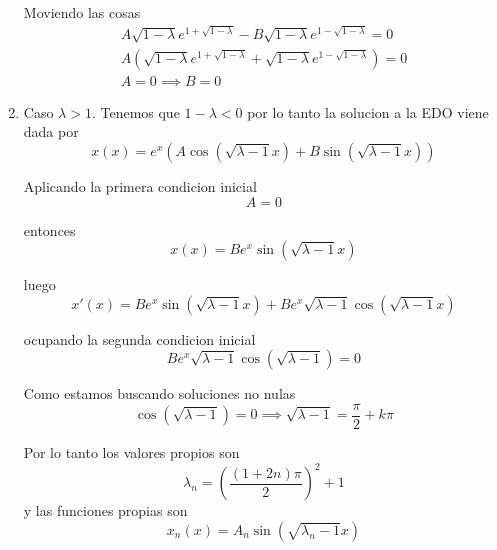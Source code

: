 \message{ !name(MAT024.tex)}\documentclass[../main.tex]{subfiles}
\begin{document}
\begin{solution}
\begin{enumerate}
            Moviendo las cosas
            \begin{gather*}
              A\sqrt{1 - \lambda}e^{1 + \sqrt{1 - \lambda}}  - B\sqrt{1 - \lambda}e^{1 - \sqrt{1 - \lambda}} = 0\\
              A(\sqrt{1 - \lambda}e^{1 + \sqrt{1 - \lambda}} + \sqrt{1 - \lambda}e^{1 - \sqrt{1 - \lambda}}) = 0\\
              A = 0 \implies B = 0
            \end{gather*}
      \item Caso $\lambda > 1$. Tenemos que $1 - \lambda < 0$ por lo tanto la solucion a la EDO viene dada por
            \begin{equation*}
              x(x) = e^{x}(A \cos(\sqrt{\lambda - 1} x) + B \sin(\sqrt{\lambda - 1}x))
            \end{equation*}

            Aplicando la primera condicion inicial
            \begin{equation*}
              A = 0
            \end{equation*}

            entonces
            \begin{equation*}
              x(x) = B e^{x} \sin(\sqrt{\lambda - 1}x)
            \end{equation*}

            luego
            \begin{equation*}
              x'(x) = Be^{x} \sin(\sqrt{\lambda - 1} x) + Be^{x} \sqrt{\lambda - 1}\cos(\sqrt{\lambda - 1} x)
            \end{equation*}

            ocupando la segunda condicion inicial
            \begin{equation*}
              Be^{x}\sqrt{\lambda - 1} \cos(\sqrt{\lambda - 1}) = 0
            \end{equation*}

            Como estamos buscando soluciones no nulas
            \begin{equation*}
              \cos(\sqrt{\lambda - 1}) = 0 \implies \sqrt{\lambda - 1} = \frac{\pi}{2} + k \pi
            \end{equation*}

            Por lo tanto los valores propios son
            \begin{equation*}
              \lambda_{n} = (\frac{(1 + 2n)\pi}{2})^{2} + 1
            \end{equation*}
            y las funciones propias son
            \begin{equation*}
              x_{n}(x) = A_{n}\sin(\sqrt{\lambda_{n} - 1}x)
            \end{equation*}


\end{enumerate}
\end{solution}
\end{document}
